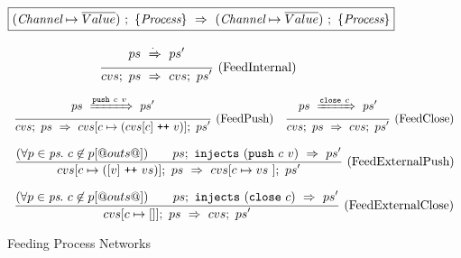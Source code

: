 
\begin{figure}

\newcommand\vs {\ti{vs}}
\newcommand\accs {\ti{accs}}
\newcommand\network {\ti{ps}}

$$
  \boxed{
    (\textit{Channel} \mapsto \overline{Value})~;~\{ \textit{Process} \}~\Rightarrow~(\textit{Channel} \mapsto \overline{Value})~;~\{ \textit{Process} \}
  }
$$







$$
\enskip \frac {\displaystyle 
  ps~\xRightarrow{\cdot}~ps'
} {\displaystyle 
  cvs;~ps~\Rightarrow~cvs;~ps'
} \  \mbox{(FeedInternal)} \enskip
$$

$$
\enskip \frac {\displaystyle 
  ps~\xRightarrow{\texttt{push}~c~v}~ps'
} {\displaystyle 
  cvs;~ps~\Rightarrow~cvs[c \mapsto (cvs[c] ~\texttt{++}~ v)];~ps'
} \  \mbox{(FeedPush)} \enskip
\enskip \frac {\displaystyle 
  ps~\xRightarrow{\texttt{close}~c}~ps'
} {\displaystyle 
  cvs;~ps~\Rightarrow~cvs;~ps'
} \  \mbox{(FeedClose)} \enskip
$$





$$
\ruleIN{
  (\forall p \in \network.~c \not\in p[@outs@])
\qquad
  \ProcsInject
    {ps}
    {(\Push~c~v)}
    {ps'}
}{
  \ProcsFeed
    {cvs[c \mapsto ([v] \listappend vs)]}
    {ps}
    {cvs[c \mapsto vs~]}
    {ps'}
}{FeedExternalPush}
$$

$$
\ruleIN{
  (\forall p \in \network.~c \not\in p[@outs@])
\qquad
  \ProcsInject
    {ps}
    {(\Close~c)}
    {ps'}
}{
  \ProcsFeed
    {cvs[c \mapsto [] ]}
    {ps}
    {cvs}
    {ps'}
}{FeedExternalClose}
$$



\caption{Feeding Process Networks}
\label{fig:Process:Eval:Feed}
\end{figure}

